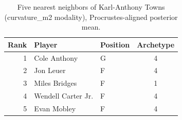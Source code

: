 \begin{table}[htbp]
  \centering\small
  \begin{tabular}{rllc}
    \toprule
    Rank & Player & Position & Archetype \\
    \midrule
    1 & Cole Anthony & G & 4 \\
    2 & Jon Leuer & F & 4 \\
    3 & Miles Bridges & F & 1 \\
    4 & Wendell Carter Jr. & F & 4 \\
    5 & Evan Mobley & F & 4 \\
    \bottomrule
  \end{tabular}
  \caption{Five nearest neighbors of Karl-Anthony Towns (curvature_m2 modality), Procrustes-aligned posterior mean.}
  \label{tab:Karl_Anthony_Towns_neighbors_curvature_m2}
\end{table}

